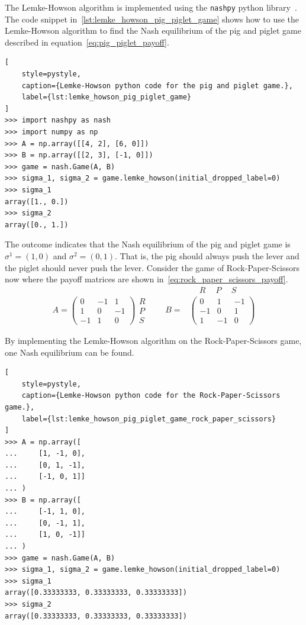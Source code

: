 The Lemke-Howson algorithm is implemented using the
\texttt{nashpy} python library~\cite{thenashpyproject}.
The code snippet in~\ref{lst:lemke_howson_pig_piglet_game} shows how to use the Lemke-Howson
algorithm to find the Nash equilibrium of the pig and piglet game described in
equation~\eqref{eq:pig_piglet_payoff}.

\begin{lstlisting}[
    style=pystyle,
    caption={Lemke-Howson python code for the pig and piglet game.},
    label={lst:lemke_howson_pig_piglet_game}
]
>>> import nashpy as nash
>>> import numpy as np
>>> A = np.array([[4, 2], [6, 0]])
>>> B = np.array([[2, 3], [-1, 0]])
>>> game = nash.Game(A, B)
>>> sigma_1, sigma_2 = game.lemke_howson(initial_dropped_label=0)
>>> sigma_1
array([1., 0.])
>>> sigma_2
array([0., 1.])

\end{lstlisting}

The outcome indicates that the Nash equilibrium of the pig and piglet game is
\(\sigma^1 = (1,0)\) and \(\sigma^2 = (0,1)\).
That is, the pig should always push the lever and the piglet should never push
the lever.
Consider the game of Rock-Paper-Scissors now where the payoff matrices are
shown in~\eqref{eq:rock_paper_scissors_payoff}.
\begin{align}
    & \quad \ R \quad \ P \quad \ S \nonumber \\
    A =
    \begin{pmatrix}
        0 & -1 & 1 \\
        1 & 0 & -1 \\
        -1 & 1 & 0
    \end{pmatrix}
    \begin{matrix}
        R \\
        P \\
        S
    \end{matrix} \qquad
    B = &
    \begin{pmatrix}
        0 & 1 & -1 \\
        -1 & 0 & 1 \\
        1 & -1 & 0
    \end{pmatrix}
    \label{eq:rock_paper_scissors_payoff}
\end{align}

By implementing the Lemke-Howson algorithm on the Rock-Paper-Scissors game, one
Nash equilibrium can be found.

\begin{lstlisting}[
    style=pystyle,
    caption={Lemke-Howson python code for the Rock-Paper-Scissors game.},
    label={lst:lemke_howson_pig_piglet_game_rock_paper_scissors}
]
>>> A = np.array([
...     [1, -1, 0],
...     [0, 1, -1],
...     [-1, 0, 1]]
... )
>>> B = np.array([
...     [-1, 1, 0], 
...     [0, -1, 1],
...     [1, 0, -1]]
... )
>>> game = nash.Game(A, B)
>>> sigma_1, sigma_2 = game.lemke_howson(initial_dropped_label=0)
>>> sigma_1
array([0.33333333, 0.33333333, 0.33333333])
>>> sigma_2
array([0.33333333, 0.33333333, 0.33333333])

\end{lstlisting}

